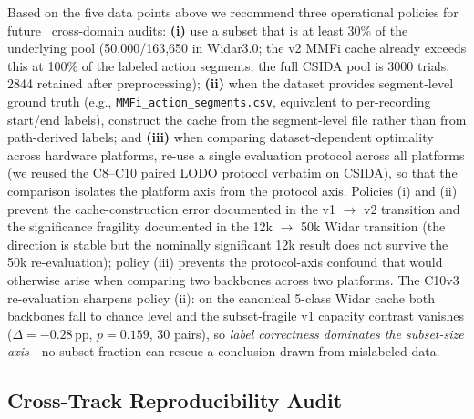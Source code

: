 \documentclass[11pt]{article}
\theoremstyle{definition}
\newcommand{\CSI}{\text{CSI}}
\begin{document}
Based on the five data points above we recommend three operational policies for future \CSI\ cross-domain audits: \textbf{(i)} use a subset that is at least 30\% of the underlying pool (50{,}000/163{,}650 in Widar3.0; the v2 MMFi cache already exceeds this at 100\% of the labeled action segments; the full CSIDA pool is 3000 trials, 2844 retained after preprocessing); \textbf{(ii)} when the dataset provides segment-level ground truth (e.g., \texttt{MMFi\_action\_segments.csv}, equivalent to per-recording start/end labels), construct the cache from the segment-level file rather than from path-derived labels; and \textbf{(iii)} when comparing dataset-dependent optimality across hardware platforms, re-use a single evaluation protocol across all platforms (we reused the C8--C10 paired LODO protocol verbatim on CSIDA), so that the comparison isolates the platform axis from the protocol axis. Policies (i) and (ii) prevent the cache-construction error documented in the v1 $\to$ v2 transition and the significance fragility documented in the 12k $\to$ 50k Widar transition (the direction is stable but the nominally significant 12k result does not survive the 50k re-evaluation); policy (iii) prevents the protocol-axis confound that would otherwise arise when comparing two backbones across two platforms. The C10v3 re-evaluation sharpens policy (ii): on the canonical 5-class Widar cache both backbones fall to chance level and the subset-fragile v1 capacity contrast vanishes ($\Delta = -0.28$\,pp, $p = 0.159$, 30 pairs), so \emph{label correctness dominates the subset-size axis}---no subset fraction can rescue a conclusion drawn from mislabeled data.

\subsection{Cross-Track Reproducibility Audit}
\label{sec:cross-track-audit}
\end{document}
